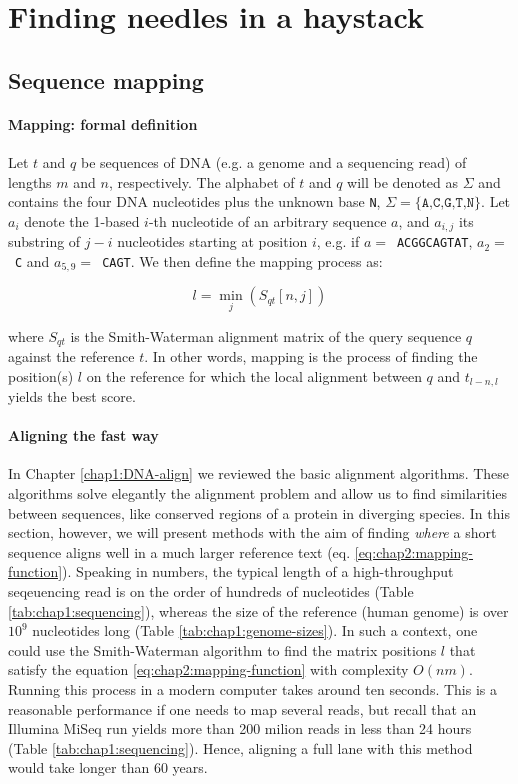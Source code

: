 \chapter{Finding needles in a haystack}
\label{chap2:mapping}
\section{Sequence mapping}
\label{sec:chap1:seed}
\subsubsection{Mapping: formal definition}
Let $t$ and $q$ be sequences of DNA (e.g. a genome and a sequencing
read) of lengths $m$ and $n$, respectively. The alphabet of $t$ and
$q$ will be denoted as $\Sigma$ and contains the four DNA nucleotides
plus the unknown base \texttt{N}, $\Sigma = \{\texttt{A,C,G,T,N}\}$. Let $a_i$ denote
the 1-based $i$-th nucleotide of an arbitrary sequence $a$, and
$a_{i,j}$ its substring of $j-i$ nucleotides starting at position $i$,
e.g. if $a=$~\texttt{ACGGCAGTAT}, $a_2=$~\texttt{C} and
$a_{5,9}=$~\texttt{CAGT}. We then define the mapping process as:

\begin{equation}
  \label{eq:chap2:mapping-function}
  l = \min\limits_{j}(S_{qt}[n,j])
\end{equation}

where $S_{qt}$ is the Smith-Waterman alignment matrix of the
query sequence $q$ against the reference $t$. In other words, mapping
is the process of finding the position(s) $l$ on the reference for which
the local alignment between $q$ and $t_{l-n,l}$ yields the best
score.

\subsubsection{Aligning the fast way}
In Chapter \ref{chap1:DNA-align} we reviewed the basic alignment
algorithms. These algorithms solve elegantly the alignment problem and
allow us to find similarities between sequences, like conserved
regions of a protein in diverging species. In this section, however,
we will present methods with the aim of finding {\em where} a short
sequence aligns well in a much larger reference text
(eq. \eqref{eq:chap2:mapping-function}). Speaking in numbers, the
typical length of a high-throughput seqeuencing read is on the order of
hundreds of nucleotides (Table \ref{tab:chap1:sequencing}), whereas
the size of the reference (human genome) is over $10^9$ nucleotides
long (Table \ref{tab:chap1:genome-sizes}). In such a context, one could
use the Smith-Waterman algorithm to find the matrix positions $l$ that
satisfy the equation \eqref{eq:chap2:mapping-function} with complexity
$O(nm)$. Running this process in a modern computer takes around ten
seconds. This is a  reasonable performance if one needs to map several
reads, but recall that an Illumina MiSeq run yields more than 200 milion
reads in less than 24 hours (Table \ref{tab:chap1:sequencing}). Hence,
aligning a full lane with this method would take longer than 60 years.

